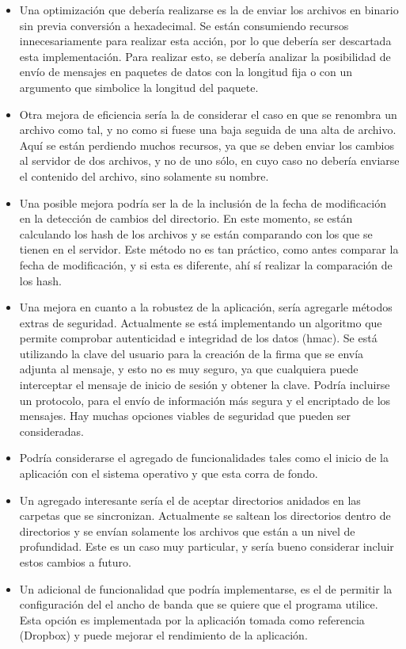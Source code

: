 \documentclass{article}
\begin{document}
\begin{itemize}
\item Una optimización que debería realizarse es la de enviar los archivos en binario sin previa conversión a hexadecimal. Se están consumiendo recursos innecesariamente para realizar esta acción, por lo que debería ser descartada esta implementación. Para realizar esto, se debería analizar la posibilidad de envío de mensajes en paquetes de datos con la longitud fija o con un argumento que simbolice la longitud del paquete.
\item Otra mejora de eficiencia sería la de considerar el caso en que se renombra un archivo como tal, y no como si fuese una baja seguida de una alta de archivo. Aquí se están perdiendo muchos recursos, ya que se deben enviar los cambios al servidor de dos archivos, y no de uno sólo, en cuyo caso no debería enviarse el contenido del archivo, sino solamente su nombre.
\item Una posible mejora podría ser la de la inclusión de la fecha de modificación en la detección de cambios del directorio. En este momento, se están calculando los hash de los archivos y se están comparando con los que se tienen en el servidor. Este método no es tan práctico, como antes comparar la fecha de modificación, y si esta es diferente, ahí sí realizar la comparación de los hash.
\item Una mejora en cuanto a la robustez de la aplicación, sería agregarle métodos extras de seguridad. Actualmente se está implementando un algoritmo que permite comprobar autenticidad e integridad de los datos (hmac). Se está utilizando la clave del usuario para la creación de la firma que se envía adjunta al mensaje, y esto no es muy seguro, ya que cualquiera puede interceptar el mensaje de inicio de sesión y obtener la clave. Podría incluirse un protocolo, para el envío de información más segura y el encriptado de los mensajes. Hay muchas opciones viables de seguridad que pueden ser consideradas.
\item Podría considerarse el agregado de funcionalidades tales como el inicio de la aplicación con el sistema operativo y que esta corra de fondo.
\item Un agregado interesante sería el de aceptar directorios anidados en las carpetas que se sincronizan. Actualmente se saltean los directorios dentro de directorios y se envían solamente los archivos que están a un nivel de profundidad. Este es un caso muy particular, y sería bueno considerar incluir estos cambios a futuro.
\item Un adicional de funcionalidad que podría implementarse, es el de permitir la configuración del el ancho de banda que se quiere que el programa utilice. Esta opción es implementada por la aplicación tomada como referencia (Dropbox) y puede mejorar el rendimiento de la aplicación.

\end{itemize}
\end{document}
